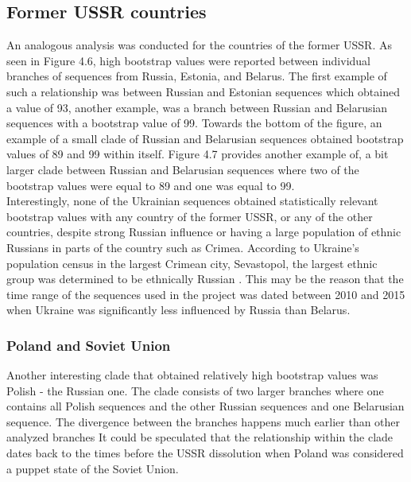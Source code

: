 \subsection{Former USSR countries}

An analogous analysis was conducted for the countries of the former USSR. 
As seen in Figure 4.6, high bootstrap values were reported between individual branches of sequences from Russia, Estonia, and Belarus. 
The first example of such a relationship was between Russian and Estonian sequences which obtained a value of 93, another example, was a branch between Russian and Belarusian sequences with a bootstrap value of 99. 
Towards the bottom of the figure, an example of a small clade of Russian and Belarusian sequences obtained bootstrap values of 89 and 99 within itself. 
Figure 4.7 provides another example of, a bit larger clade between Russian and Belarusian sequences where two of the bootstrap values were equal to 89 and one was equal to 99. \\
Interestingly, none of the Ukrainian sequences obtained statistically relevant bootstrap values with any country of the former USSR, or any of the other countries, despite strong Russian influence or having a large population of ethnic Russians in parts of the country such as Crimea.
According to Ukraine's population census in the largest Crimean city, Sevastopol, the largest ethnic group was determined to be ethnically Russian \cite{statestatisticscommitteeofukraine_2007_}.
This may be the reason that the time range of the sequences used in the project was dated between 2010 and 2015 when Ukraine was significantly less influenced by Russia than Belarus. 


\subsubsection{Poland and Soviet Union}

Another interesting clade that obtained relatively high bootstrap values was Polish - the Russian one. 
The clade consists of two larger branches where one contains all Polish sequences and the other Russian sequences and one Belarusian sequence. 
The divergence between the branches happens much earlier than other analyzed branches It could be speculated that the relationship within the clade dates back to the times before the USSR dissolution when Poland was considered a puppet state of the Soviet Union.

